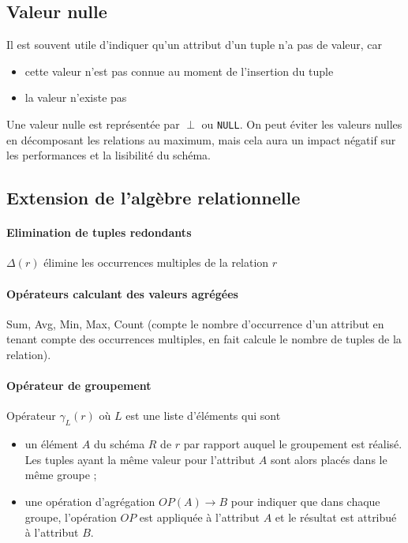 	
	
	\subsection{Valeur nulle}
	
	Il est souvent utile d'indiquer qu'un attribut d'un tuple n'a pas de valeur, car
	
	\begin{itemize}
		\item cette valeur n'est pas connue au moment de l'insertion du tuple
		\item la valeur n'existe pas
	\end{itemize}
	
	Une valeur nulle est représentée par $\perp$ ou \texttt{NULL}. On peut éviter les valeurs nulles en décomposant les relations au maximum, mais cela aura un impact négatif sur les performances et la lisibilité du schéma.
	
	
	\subsection{Extension de l'algèbre relationnelle}
	
	\paragraph{Elimination de tuples redondants}
	
	$\Delta (r)$ élimine les occurrences multiples de la relation $r$
	
	\paragraph{Opérateurs calculant des valeurs agrégées}
	
	Sum, Avg, Min, Max, Count (compte le nombre d'occurrence d'un attribut en tenant compte des occurrences multiples, en fait calcule le nombre de tuples de la relation).
	
	
	\paragraph{Opérateur de groupement}
	
	 Opérateur $\gamma_L(r)$ où $L$ est une liste d'éléments qui sont
	 
	 \begin{itemize}
	 	\item un élément $A$ du schéma $R$ de $r$ par rapport auquel le groupement est réalisé. Les tuples ayant la même valeur pour l'attribut $A$ sont alors placés dans le même groupe ;
	 	\item une opération d'agrégation $OP(A) \rightarrow B$ pour indiquer que dans chaque groupe, l'opération $OP$ est appliquée à l'attribut $A$ et le résultat est attribué à l'attribut $B$.
	 \end{itemize}
	 
